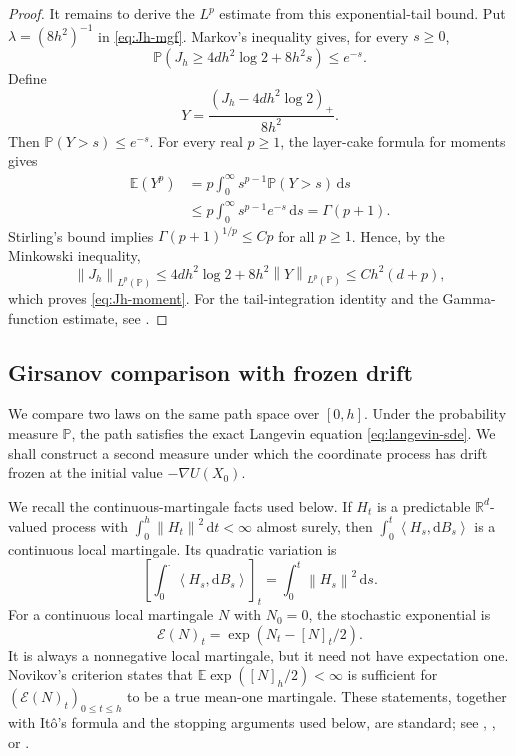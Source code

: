 \documentclass[11pt]{article}
\newcommand{\R}{\mathbb R}
\newcommand{\E}{\mathbb E}
\newcommand{\ip}[2]{\left\langle #1,#2\right\rangle}
\newcommand{\norm}[1]{\left\lVert #1\right\rVert}
\newcommand{\1}{\mathbf 1}
\newcommand{\df}{\mathrm{d}}
\begin{document}
\begin{proof}
		It remains to derive the \(L^p\) estimate from this exponential-tail bound.
		Put \(\lambda=(8h^2)^{-1}\) in
		\eqref{eq:Jh-mgf}.  Markov's inequality gives, for every \(s\geq0\),
		\begin{equation*}
			\mathbb P\left(
			J_h\geq4dh^2\log 2+8h^2s
			\right)
			\leq e^{-s}.
		\end{equation*}
		Define
		\[
		Y=\frac{(J_h-4dh^2\log 2)_+}{8h^2}.
		\]
		Then \(\mathbb P(Y>s)\leq e^{-s}\).  For every real \(p\geq1\), the
		layer-cake formula for moments gives
		\begin{align*}
			\E (Y^p)
			&=p\int_0^\infty s^{p-1}\mathbb P(Y>s)\,\df s\\
			&\leq p\int_0^\infty s^{p-1}e^{-s}\,\df s
			=\Gamma(p+1).
		\end{align*}
		Stirling's bound implies \(\Gamma(p+1)^{1/p}\leq Cp\) for all
		\(p\geq1\).  Hence, by the Minkowski inequality,
		\[
		\norm{J_h}_{L^p(\mathbb P)}
		\leq4dh^2\log 2+8h^2\norm{Y}_{L^p(\mathbb P)}
		\leq Ch^2(d+p),
		\]
		which proves \eqref{eq:Jh-moment}.  For the tail-integration identity and the
		Gamma-function estimate, see
		\citet[Chapter~2]{BoucheronLugosiMassart2013}.
	\end{proof}
	
	\subsection{Girsanov comparison with frozen drift}\label{ssec:girsanov-frozen}
	
	We compare two laws on the same path space over \([0,h]\).  Under the
	probability measure \(\mathbb P\), the path satisfies the exact
	Langevin equation \eqref{eq:langevin-sde}.  We shall construct a second
	measure under which the coordinate process has drift frozen at the initial
	value \(-\nabla U(X_0)\).
	
	We recall the continuous-martingale facts used below.  If \(H_t\) is a
	predictable \(\R^d\)-valued process with
	\(\int_0^h\norm{H_t}^2\,\df t<\infty\) almost surely, then
	\(\int_0^t\ip{H_s}{\df B_s}\) is a continuous local martingale.  Its quadratic
	variation is
	\[
	\left[
	\int_0^\cdot\ip{H_s}{\df B_s}
	\right]_t
	=\int_0^t\norm{H_s}^2\,\df s.
	\]
	For a continuous
	local martingale \(N\) with \(N_0=0\), the stochastic exponential is
	\[
	\mathcal E(N)_t=\exp(N_t-[N]_t/2).
	\]
	It is always a nonnegative local martingale, but it need not have expectation
	one.  Novikov's criterion states that
	\(\E\exp([N]_h/2)<\infty\) is sufficient for
	\((\mathcal E(N)_t)_{0\leq t\leq h}\) to be a true mean-one martingale.
	These statements, together with It\^o's formula and the stopping arguments
	used below, are standard; see \citet[Chapter~3]{KaratzasShreve1991},
	\citet[Chapters~IV and~VIII]{RevuzYor1999}, or
	\citet{Kallenberg2021}.
	
\end{document}
